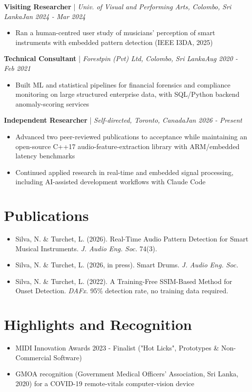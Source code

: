 \documentclass[11pt]{article}
\newenvironment{cvrole}[5]{%
  \par\noindent\textbf{\large #1} | \textit{\small #2, #3}\hfill \textit{\small #4 - #5}\par
  \begin{itemize}[leftmargin=2em, itemsep=-0.3em, topsep=-0.5em]%
}{%
  \end{itemize}\par\noindent\mbox{}\par\vspace{0.1em}%
}
\begin{document}
\begin{cvrole}{Visiting Researcher}{Univ. of Visual and Performing Arts}{Colombo, Sri Lanka}{Jan 2024}{Mar 2024}
    \item Ran a human-centred user study of musicians' perception of smart instruments with
    embedded pattern detection (IEEE I3DA, 2025)
\end{cvrole}

\begin{cvrole}{Technical Consultant}{Forestpin (Pvt) Ltd}{Colombo, Sri Lanka}{Aug 2020}{Feb 2021}
    \item Built ML and statistical pipelines for financial forensics and compliance monitoring on
    large structured enterprise data, with SQL/Python backend anomaly-scoring services
\end{cvrole}

\begin{cvrole}{Independent Researcher}{Self-directed}{Toronto, Canada}{Jan 2026}{Present}
    \item Advanced two peer-reviewed publications to acceptance while maintaining an open-source
    C++17 audio-feature-extraction library with ARM/embedded latency benchmarks
    \item Continued applied research in real-time and embedded signal processing, including
    AI-assisted development workflows with Claude Code
\end{cvrole}

\section*{Publications}
\begin{itemize}[leftmargin=1.5em, itemsep=-0.2em, topsep=0.2em]
    \item Silva, N. \& Turchet, L. (2026). Real-Time Audio Pattern Detection for Smart Musical
    Instruments. \textit{J. Audio Eng. Soc.} 74(3).
    \item Silva, N. \& Turchet, L. (2026, in press). Smart Drums. \textit{J. Audio Eng. Soc.}
    \item Silva, N. \& Turchet, L. (2022). A Training-Free SSIM-Based Method for Onset Detection.
    \textit{DAFx.} 95\% detection rate, no training data required.
\end{itemize}

\section*{Highlights and Recognition}
\begin{itemize}[leftmargin=1.5em, itemsep=-0.2em, topsep=0.2em]
    \item MIDI Innovation Awards 2023 - Finalist ("Hot Licks", Prototypes \& Non-Commercial Software)
    \item GMOA recognition (Government Medical Officers' Association, Sri Lanka, 2020) for a
    COVID-19 remote-vitals computer-vision device
\end{itemize}
\end{document}
